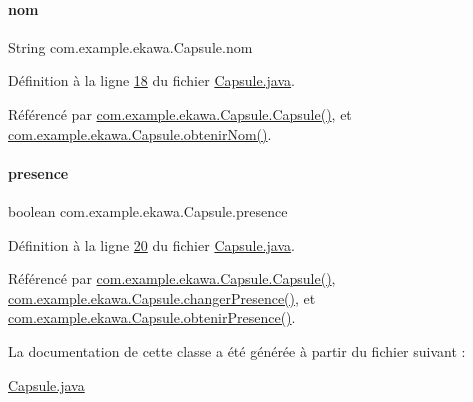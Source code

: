 \paragraph{\texorpdfstring{nom}{nom}}
{\footnotesize\ttfamily String com.\+example.\+ekawa.\+Capsule.\+nom\hspace{0.3cm}{\ttfamily [private]}}



Définition à la ligne \hyperlink{_capsule_8java_source_l00018}{18} du fichier \hyperlink{_capsule_8java_source}{Capsule.\+java}.



Référencé par \hyperlink{_capsule_8java_source_l00027}{com.\+example.\+ekawa.\+Capsule.\+Capsule()}, et \hyperlink{_capsule_8java_source_l00038}{com.\+example.\+ekawa.\+Capsule.\+obtenir\+Nom()}.

\mbox{\label{classcom_1_1example_1_1ekawa_1_1_capsule_a351ef1f4b4258f4651d24b206fc38a94}} 
\paragraph{\texorpdfstring{presence}{presence}}
{\footnotesize\ttfamily boolean com.\+example.\+ekawa.\+Capsule.\+presence\hspace{0.3cm}{\ttfamily [private]}}



Définition à la ligne \hyperlink{_capsule_8java_source_l00020}{20} du fichier \hyperlink{_capsule_8java_source}{Capsule.\+java}.



Référencé par \hyperlink{_capsule_8java_source_l00027}{com.\+example.\+ekawa.\+Capsule.\+Capsule()}, \hyperlink{_capsule_8java_source_l00061}{com.\+example.\+ekawa.\+Capsule.\+changer\+Presence()}, et \hyperlink{_capsule_8java_source_l00056}{com.\+example.\+ekawa.\+Capsule.\+obtenir\+Presence()}.



La documentation de cette classe a été générée à partir du fichier suivant \+:\begin{DoxyCompactItemize}
\item 
\hyperlink{_capsule_8java}{Capsule.\+java}\end{DoxyCompactItemize}
